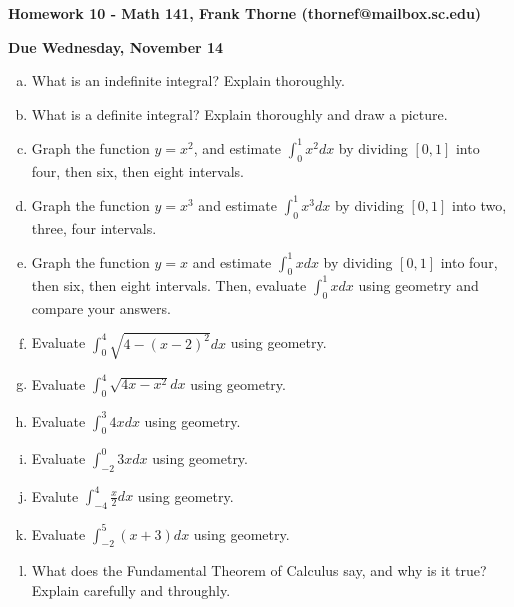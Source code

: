 \documentclass[12pt]{article}
\newcommand{\dx}{dx}
\begin{document}
\setlength{\topmargin}{-2mm}





\begin{center}{\bf Homework 10 - Math 141, Frank Thorne (thornef@mailbox.sc.edu)}
\end{center}
\begin{center}
{\bf Due Wednesday, November 14}
\end{center}

\begin{enumerate}[(a)]

\item
What is an indefinite integral? Explain thoroughly.

\item
What is a definite integral? Explain thoroughly and draw a picture.

\item
Graph the function $y = x^2$, and estimate $\int_0^1 x^2 dx$ by dividing
$[0, 1]$ into four, then six, then eight intervals.

\item
Graph the function $y = x^3$ and estimate $\int_0^1 x^3 dx$ by dividing
$[0, 1]$ into two, three, four intervals.

\item
Graph the function $y = x$ and estimate $\int_0^1 x dx$ by dividing
$[0, 1]$ into four, then six, then eight intervals. Then, evaluate $\int_0^1 x dx$
using geometry and compare your answers.

\item
Evaluate $\int_0^4 \sqrt{4 - (x - 2)^2} \dx$ using geometry.

\item
Evaluate $\int_0^4 \sqrt{4x - x^2} \dx$ using geometry.

\item
Evaluate $\int_0^3 4x \dx$ using geometry.

\item
Evaluate $\int_{-2}^0 3x \dx$ using geometry.

\item
Evalute $\int_{-4}^4 \frac{x}{2} \dx$ using geometry.

\item
Evaluate $\int_{-2}^5 (x + 3) \dx$ using geometry.

\item
What does the Fundamental Theorem of Calculus say, and why is it true? Explain carefully
and throughly.


\end{enumerate}
\end{document}
